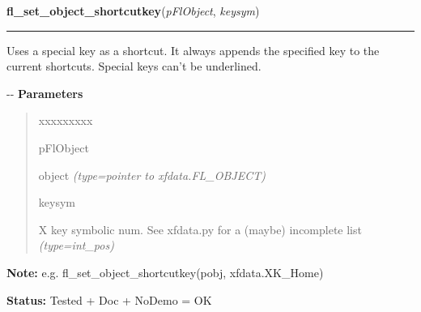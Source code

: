 \hspace{.8\funcindent}\begin{boxedminipage}{\funcwidth}

    \raggedright \textbf{fl\_set\_object\_shortcutkey}(\textit{pFlObject}, \textit{keysym})

    \vspace{-1.5ex}

    \rule{\textwidth}{0.5\fboxrule}
\setlength{\parskip}{2ex}

Uses a special key as a shortcut. It always appends the specified key
to the current shortcuts. Special keys can't be underlined.

-{}-
\setlength{\parskip}{1ex}
      \textbf{Parameters}
      \vspace{-1ex}

      \begin{quote}
        \begin{Ventry}{xxxxxxxxx}

          \item[pFlObject]


object
            {\it (type=pointer to xfdata.FL\_OBJECT)}

          \item[keysym]


X key symbolic num. See xfdata.py for a (maybe) incomplete list
            {\it (type=int\_pos)}

        \end{Ventry}

      \end{quote}

\textbf{Note:} 
e.g. fl\_set\_object\_shortcutkey(pobj, xfdata.XK\_Home)


\textbf{Status:} 
Tested + Doc + NoDemo = OK


    \end{boxedminipage}

    \label{xformslib:flbasic:fl_set_object_dblbuffer}

    \vspace{0.5ex}

